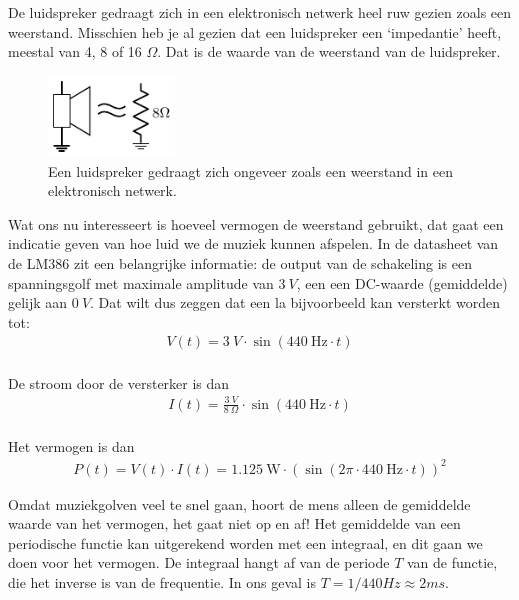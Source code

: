\documentclass{article}
\begin{document}
			De luidspreker gedraagt zich in een elektronisch netwerk heel ruw gezien zoals een weerstand. Misschien heb je al gezien dat een luidspreker een `impedantie' heeft, meestal van 4, 8 of 16 $\Omega$. Dat is de waarde van de weerstand van de luidspreker.

			\begin{figure}[htbp]
				\centering
				\includegraphics[width=0.3\textwidth]{luidspreker}
				\caption{Een luidspreker gedraagt zich ongeveer zoals een weerstand in een elektronisch netwerk.}
				\label{fig:luidspreker}
			\end{figure}

			Wat ons nu interesseert is hoeveel vermogen de weerstand gebruikt, dat gaat een indicatie geven van hoe luid we de muziek kunnen afspelen.
			In de datasheet van de LM386 zit  een belangrijke informatie: de output van de schakeling is een spanningsgolf met maximale amplitude van $3~V$, een een DC-waarde (gemiddelde) gelijk aan $0~V$.
			Dat wilt dus zeggen dat een la bijvoorbeeld kan versterkt worden tot:
			\begin{align}
				V(t) = 3~V \cdot \sin (440~\text{Hz} \cdot t) \\
			\end{align}

			De stroom door de versterker is dan 
				\begin{align}
				I(t) = \frac{3~V}{8~\Omega} \cdot \sin (440~\text{Hz} \cdot t) \\
			\end{align}

			Het vermogen is dan
			\begin{align}
				P(t) = V(t) \cdot I(t) = 1.125~\text{W} \cdot \left( \sin \left(2\pi \cdot 440~\text{Hz} \cdot t\right) \right)^2
			\end{align}

			Omdat muziekgolven veel te snel gaan, hoort de mens alleen de gemiddelde waarde van het vermogen, het gaat niet op en af! 
			Het gemiddelde van een periodische functie kan uitgerekend worden met een integraal, en dit gaan we doen voor het vermogen. 
			De integraal hangt af van de periode $T$ van de functie, die het inverse is van de frequentie. In ons geval is $T = 1/440Hz \approx 2 ms$.
\end{document}
